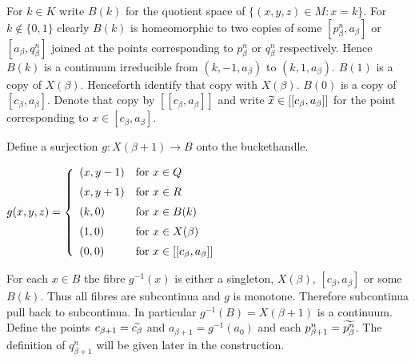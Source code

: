 \documentclass[12pt]{article}
\theoremstyle{plain}
\theoremstyle{definition}
\newcommand{\B}{\ensuremath{\beta}}
\newcommand{\0}{\ensuremath{\varnothing}}
\newcommand{\tl}{\ensuremath{\widetilde}}
\newcommand{\wt}{\ensuremath{\widetilde}}
\begin{document}
	
	
	
	For $k \in K$ write $B(k)$ for the quotient space of $\{(x,y,z) \in M : x=k \}$.
	For $k \notin \{0,1\}$ clearly $B(k)$ is homeomorphic to two copies of some $[p^n_\B, a_\B] $ or $[a_\B, q^n_\B]$ 
	joined at the points corresponding to $p^n_\B$ or $q^n_\B$ respectively.
	Hence $B(k)$ is a continuum irreducible from $(k,-1,a_\B)$ to $(k,1,a_\B)$.
	$B(1)$ is a copy of $X(\B)$.
	Henceforth identify that copy with $X(\B)$.
	$B(0)$ is a copy of $[c_\B,a_\B]$.
	Denote that copy by $[[c_\B,a_\B]]$ and write $\tl x \in [[c_\B,a_\B]]$ for the point corresponding to $x \in [c_\B,a_\B]$.
	
	Define a surjection $g: X(\B+1) \to B$ onto the buckethandle.
	
	\begin{center}
		$g(x,y,z) =
		\left\{
		\begin{array}{ll}
		(x,y -1) & \mbox{for } x \in Q \vspace{2mm} \\
		(x , y+1) & \mbox{for } x \in R \vspace{2mm}\\
		(k,0) & \mbox{for } x \in B(k) \vspace{2mm}\\
		(1,0) & \mbox{for } x \in X(\B) \vspace{2mm}\\
		(0,0) & \mbox{for } x \in [[c_\B,a_\B]]
		\end{array} 
		\right. { }$ 
	\end{center}
	
	For each $x \in B$ the fibre $g^{-1}(x)$ is either a singleton, $X(\B)$, $[c_\B,a_\B]$ or some $B(k)$.
	Thus all fibres are subcontinua and $g$ is monotone.
	Therefore subcontinua pull back to subcontinua.
	In particular $g^{-1}(B) = X(\B+1)$ is a continuum.
	Define the points $c_{\B+1} = \tl{c_\B}$ and $a_{\B+1} = g^{-1}(a_0)$ and each $p^n_{\B+1} = \wt{p^n_{\B}}$. The definition of $q^n_{\B+1}$ will be given later in the construction.
	
	
	
\end{document}
